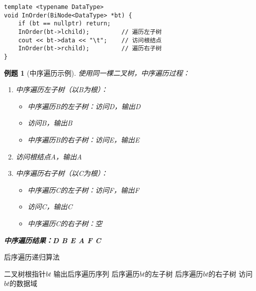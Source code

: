 \documentclass[12pt,a4paper]{amsart}
\newtheorem{example}{例题}[section]
\begin{document}
\begin{lstlisting}[caption=中序遍历递归实现]
template <typename DataType>
void InOrder(BiNode<DataType> *bt) {
    if (bt == nullptr) return;
    InOrder(bt->lchild);         // 遍历左子树
    cout << bt->data << "\t";    // 访问根结点
    InOrder(bt->rchild);         // 遍历右子树
}
\end{lstlisting}
\begin{center}
    \end{center}
\begin{example}[中序遍历示例]
使用同一棵二叉树，中序遍历过程：
\begin{enumerate}
\item 中序遍历左子树（以B为根）：
    \begin{itemize}
    \item 中序遍历B的左子树：访问D，输出D
    \item 访问B，输出B
    \item 中序遍历B的右子树：访问E，输出E
    \end{itemize}
\item 访问根结点A，输出A
\item 中序遍历右子树（以C为根）：
    \begin{itemize}
    \item 中序遍历C的左子树：访问F，输出F
    \item 访问C，输出C
    \item 中序遍历C的右子树：空
    \end{itemize}
\end{enumerate}

\textbf{中序遍历结果：D B E A F C}
\end{example}

\begin{algorithm}[H]
\caption{后序遍历递归算法}
\begin{algorithmic}[1]
\REQUIRE 二叉树根指针$bt$
\ENSURE 输出后序遍历序列
\STATE 后序遍历$bt$的左子树
\STATE 后序遍历$bt$的右子树
\STATE 访问$bt$的数据域
\ENDIF
\end{algorithmic}
\end{algorithm}
\end{document}

